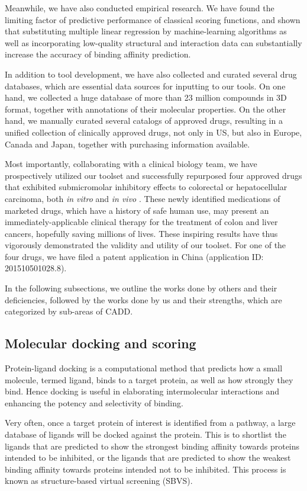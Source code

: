 \documentclass[a4paper,12pt]{article}
\begin{document}
Meanwhile, we have also conducted empirical research. We have found the limiting factor of predictive performance of classical scoring functions, and shown that substituting multiple linear regression by machine-learning algorithms as well as incorporating low-quality structural and interaction data can substantially increase the accuracy of binding affinity prediction.

In addition to tool development, we have also collected and curated several drug databases, which are essential data sources for inputting to our tools. On one hand, we collected a huge database of more than 23 million compounds in 3D format, together with annotations of their molecular properties. On the other hand, we manually curated several catalogs of approved drugs, resulting in a unified collection of clinically approved drugs, not only in US, but also in Europe, Canada and Japan, together with purchasing information available.

Most importantly, collaborating with a clinical biology team, we have prospectively utilized our toolset and successfully repurposed four approved drugs that exhibited submicromolar inhibitory effects to colorectal or hepatocellular carcinoma, both \textit{in vitro} and \textit{in vivo} \cite{1667,1681}. These newly identified medications of marketed drugs, which have a history of safe human use, may present an immediately-applicable clinical therapy for the treatment of colon and liver cancers, hopefully saving millions of lives. These inspiring results have thus vigorously demonstrated the validity and utility of our toolset. For one of the four drugs, we have filed a patent application in China (application ID: 201510501028.8).

In the following subsections, we outline the works done by others and their deficiencies, followed by the works done by us and their strengths, which are categorized by sub-areas of CADD.

\subsection*{Molecular docking and scoring}

Protein-ligand docking is a computational method that predicts how a small molecule, termed ligand, binds to a target protein, as well as how strongly they bind. Hence docking is useful in elaborating intermolecular interactions and enhancing the potency and selectivity of binding.

Very often, once a target protein of interest is identified from a pathway, a large database of ligands will be docked against the protein. This is to shortlist the ligands that are predicted to show the strongest binding affinity towards proteins intended to be inhibited, or the ligands that are predicted to show the weakest binding affinity towards proteins intended not to be inhibited. This process is known as structure-based virtual screening (SBVS).
\end{document}
